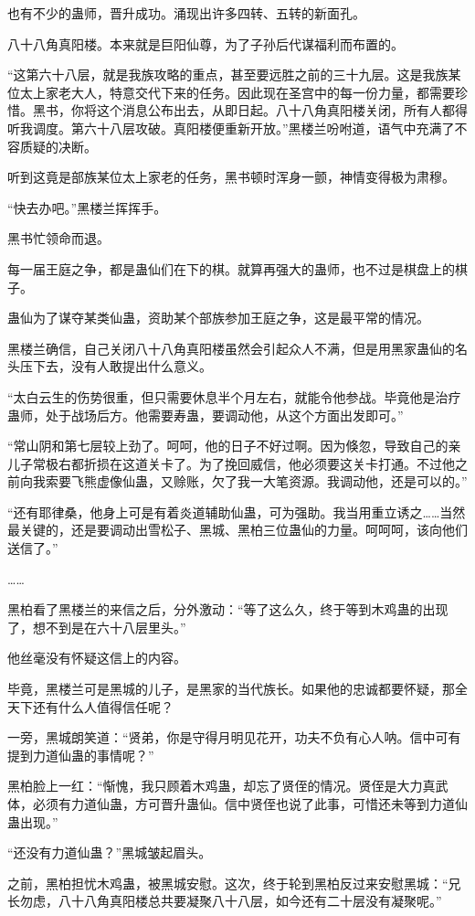 \begin{this_body}
也有不少的蛊师，晋升成功。涌现出许多四转、五转的新面孔。

八十八角真阳楼。本来就是巨阳仙尊，为了子孙后代谋福利而布置的。

“这第六十八层，就是我族攻略的重点，甚至要远胜之前的三十九层。这是我族某位太上家老大人，特意交代下来的任务。因此现在圣宫中的每一份力量，都需要珍惜。黑书，你将这个消息公布出去，从即日起。八十八角真阳楼关闭，所有人都得听我调度。第六十八层攻破。真阳楼便重新开放。”黑楼兰吩咐道，语气中充满了不容质疑的决断。

听到这竟是部族某位太上家老的任务，黑书顿时浑身一颤，神情变得极为肃穆。

“快去办吧。”黑楼兰挥挥手。

黑书忙领命而退。

每一届王庭之争，都是蛊仙们在下的棋。就算再强大的蛊师，也不过是棋盘上的棋子。

蛊仙为了谋夺某类仙蛊，资助某个部族参加王庭之争，这是最平常的情况。

黑楼兰确信，自己关闭八十八角真阳楼虽然会引起众人不满，但是用黑家蛊仙的名头压下去，没有人敢提出什么意义。

“太白云生的伤势很重，但只需要休息半个月左右，就能令他参战。毕竟他是治疗蛊师，处于战场后方。他需要寿蛊，要调动他，从这个方面出发即可。”

“常山阴和第七层较上劲了。呵呵，他的日子不好过啊。因为倏忽，导致自己的亲儿子常极右都折损在这道关卡了。为了挽回威信，他必须要这关卡打通。不过他之前向我索要飞熊虚像仙蛊，又赊账，欠了我一大笔资源。我调动他，还是可以的。”

“还有耶律桑，他身上可是有着炎道辅助仙蛊，可为强助。我当用重立诱之……当然最关键的，还是要调动出雪松子、黑城、黑柏三位蛊仙的力量。呵呵呵，该向他们送信了。”

……

黑柏看了黑楼兰的来信之后，分外激动：“等了这么久，终于等到木鸡蛊的出现了，想不到是在六十八层里头。”

他丝毫没有怀疑这信上的内容。

毕竟，黑楼兰可是黑城的儿子，是黑家的当代族长。如果他的忠诚都要怀疑，那全天下还有什么人值得信任呢？

一旁，黑城朗笑道：“贤弟，你是守得月明见花开，功夫不负有心人呐。信中可有提到力道仙蛊的事情呢？”

黑柏脸上一红：“惭愧，我只顾着木鸡蛊，却忘了贤侄的情况。贤侄是大力真武体，必须有力道仙蛊，方可晋升蛊仙。信中贤侄也说了此事，可惜还未等到力道仙蛊出现。”

“还没有力道仙蛊？”黑城皱起眉头。

之前，黑柏担忧木鸡蛊，被黑城安慰。这次，终于轮到黑柏反过来安慰黑城：“兄长勿虑，八十八角真阳楼总共要凝聚八十八层，如今还有二十层没有凝聚呢。”


\end{this_body}
